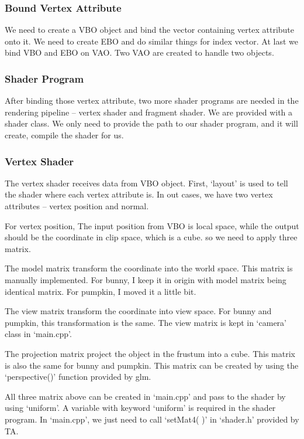 \documentclass[acmtog]{acmart}
\begin{document}
\subsubsection{Bound Vertex Attribute}
We need to create a VBO object and bind the vector containing vertex attribute onto it. We need to create EBO and do similar things for index vector. At last we bind VBO and EBO on VAO. Two VAO are created to handle two objects.


\subsubsection{Shader Program}
After binding those vertex attribute, two more shader programs are needed in the rendering pipeline -- vertex shader and fragment shader. We are provided with a shader class. We only need to provide the path to our shader program, and it will create, compile the shader for us.

\subsubsection{Vertex Shader}
The vertex shader receives data from VBO object. First, `layout' is used to tell the shader where each vertex attribute is. In out cases, we have two vertex attributes -- vertex position and normal.

For vertex position, The input position from VBO is local space, while the output should be the coordinate in clip space, which is a cube. so we need to apply three matrix.

The model matrix transform the coordinate into the world space. This matrix is manually implemented. For bunny, I keep it in origin with model matrix being identical matrix. For pumpkin, I moved it a little bit.

The view matrix transform the coordinate into view space. For bunny and pumpkin, this transformation is the same. The view matrix is kept in `camera' class in `main.cpp'.

The projection matrix project the object in the frustum into a cube. This matrix is also the same for bunny and pumpkin. This matrix can be created by using the `perspective()' function provided by glm.

All three matrix above can be created in `main.cpp' and pass to the shader by using `uniform'. A variable with keyword `uniform' is required in the shader program. In `main.cpp', we just need to call `setMat4( )' in `shader.h' provided by TA.
\end{document}
